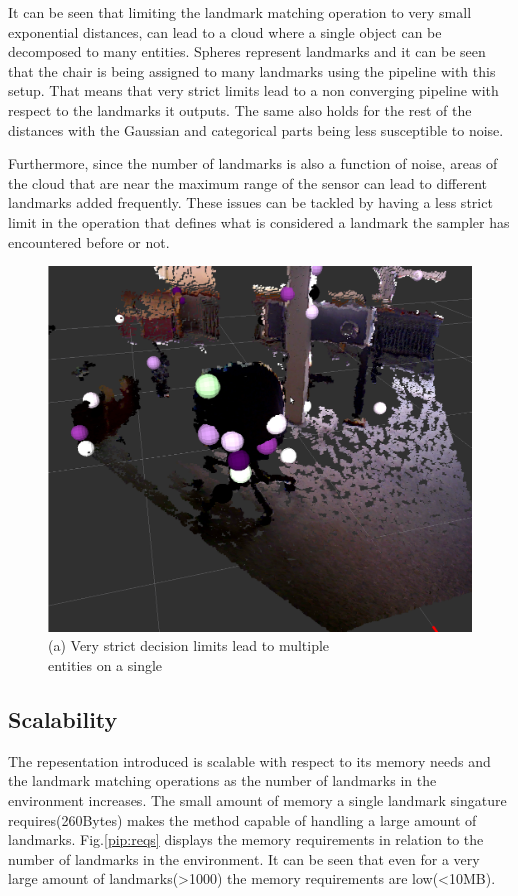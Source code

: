 \documentclass[twoside,hidelinks]{article}
\begin{document}
It can be seen that limiting the landmark matching operation to very small exponential distances, can lead to a cloud where a single object can be decomposed to many entities. Spheres represent landmarks and it can be seen that the chair is being assigned to many landmarks using the pipeline with this setup. That means that very strict limits lead to a non converging pipeline with respect to the landmarks it outputs. The same also holds for the rest of the distances with the Gaussian and categorical parts being less susceptible to noise. 

Furthermore, since the number of landmarks is also a function of noise, areas of the cloud that are near the maximum range of the sensor can lead to different landmarks added frequently. These issues can be tackled by having a less strict limit in the operation that defines what is considered a landmark the sampler has encountered before or not.

\begin{figure}[!ht]
        \centering
	    \includegraphics[width=.5\textwidth]{monsterchair} \\
	  (a) Very strict decision limits lead to multiple \\
	   entities on a single \\[6pt]
	  \label{pip:expo}
\end{figure}

\subsection{Scalability}

The repesentation introduced is scalable with respect to its memory needs and the landmark matching operations as the number of landmarks in the environment increases.
The small amount of memory a single landmark singature requires(260Bytes) makes the method capable of handling a large amount of landmarks. Fig.\ref{pip:reqs} displays the memory requirements in relation to the number of landmarks in the environment. It can be seen that even for a very large amount of landmarks(>1000) the memory requirements are low(<10MB).
\end{document}
